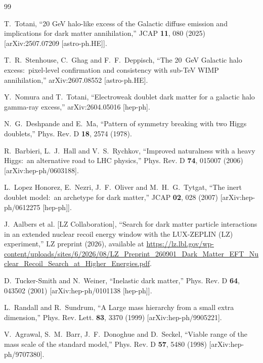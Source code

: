 \documentclass[aps,prd,twocolumn,nofootinbib,superscriptaddress]{revtex4-2}
\begin{document}
\begin{thebibliography}{99}

T.~Totani,
``20 GeV halo-like excess of the Galactic diffuse emission and implications for dark matter annihilation,''
JCAP \textbf{11}, 080 (2025)
[arXiv:2507.07209 [astro-ph.HE]].

T.~R.~Stenhouse, C.~Ghag and F.~F.~Deppisch,
``The 20~GeV Galactic halo excess:\ pixel-level confirmation and consistency with sub-TeV WIMP annihilation,''
arXiv:2607.08552 [astro-ph.HE].

Y.~Nomura and T.~Totani,
``Electroweak doublet dark matter for a galactic halo gamma-ray excess,''
arXiv:2604.05016 [hep-ph].

N.~G.~Deshpande and E.~Ma,
``Pattern of symmetry breaking with two Higgs doublets,''
Phys. Rev. D \textbf{18}, 2574 (1978).

R.~Barbieri, L.~J.~Hall and V.~S.~Rychkov,
``Improved naturalness with a heavy Higgs:\ an alternative road to LHC physics,''
Phys. Rev. D \textbf{74}, 015007 (2006)
[arXiv:hep-ph/0603188].

L.~Lopez Honorez, E.~Nezri, J.~F.~Oliver and M.~H.~G.~Tytgat,
``The inert doublet model:\ an archetype for dark matter,''
JCAP \textbf{02}, 028 (2007)
[arXiv:hep-ph/0612275 [hep-ph]].

J.~Aalbers et al. [LZ Collaboration],
``Search for dark matter particle interactions in an extended nuclear recoil energy window with the LUX-ZEPLIN (LZ) experiment,''
LZ preprint (2026), available at
\url{https://lz.lbl.gov/wp-content/uploads/sites/6/2026/08/LZ_Preprint_260901_Dark_Matter_EFT_Nuclear_Recoil_Search_at_Higher_Energies.pdf}.

D.~Tucker-Smith and N.~Weiner,
``Inelastic dark matter,''
Phys. Rev. D \textbf{64}, 043502 (2001)
[arXiv:hep-ph/0101138 [hep-ph]].

L.~Randall and R.~Sundrum,
``A Large mass hierarchy from a small extra dimension,''
Phys. Rev. Lett. \textbf{83}, 3370 (1999)
[arXiv:hep-ph/9905221].

V.~Agrawal, S.~M.~Barr, J.~F.~Donoghue and D.~Seckel,
``Viable range of the mass scale of the standard model,''
Phys. Rev. D \textbf{57}, 5480 (1998)
[arXiv:hep-ph/9707380].


\end{thebibliography}
\end{document}
